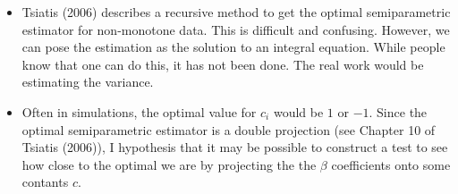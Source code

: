 \documentclass[12pt]{article}
\begin{document}
\begin{itemize}
  \item Tsiatis (2006) describes a recursive method to get the optimal 
    semiparametric estimator for non-monotone data. This is difficult and 
    confusing. However, we can pose the estimation as the solution to an 
    integral equation. While people know that one can do this, it has not 
    been done. The real work would be estimating the variance.
  \item Often in simulations, the optimal value for $c_i$ would be $1$ or 
    $-1$. Since the optimal semiparametric estimator is a double projection
    (see Chapter 10 of Tsiatis (2006)), I hypothesis that it may be possible to
    construct a test to see how close to the optimal we are by projecting 
    the the $\beta$ coefficients onto some contants $c$.
\end{itemize}
\end{document}
